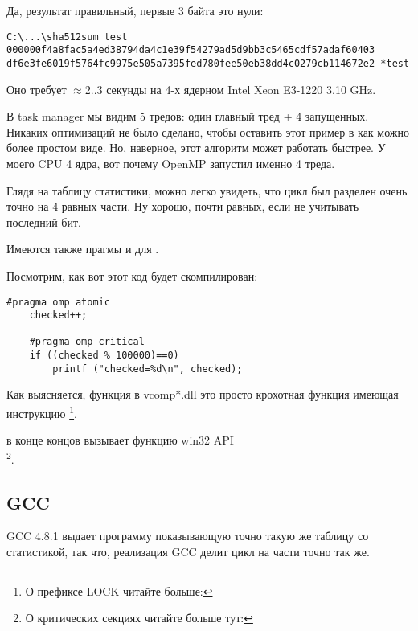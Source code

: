 Да, результат правильный, первые 3 байта это нули:

\begin{lstlisting}
C:\...\sha512sum test
000000f4a8fac5a4ed38794da4c1e39f54279ad5d9bb3c5465cdf57adaf60403
df6e3fe6019f5764fc9975e505a7395fed780fee50eb38dd4c0279cb114672e2 *test
\end{lstlisting}

Оно требует $\approx2..3$ секунды на 4-х ядерном Intel Xeon E3-1220 3.10 GHz.

В task manager мы видим 5 тредов: один главный тред + 4 запущенных.
Никаких оптимизаций не было сделано, чтобы оставить этот пример в как можно более простом виде.
Но, наверное, этот алгоритм может работать быстрее.
У моего \ac{CPU} 4 ядра, вот почему OpenMP запустил именно 4 треда.

Глядя на таблицу статистики, можно легко увидеть, что цикл был разделен очень точно на 4 равных части.
Ну хорошо, почти равных, если не учитывать последний бит.

Имеются также прагмы и для .

Посмотрим, как вот этот код будет скомпилирован:

\begin{lstlisting}[style=customc]
	#pragma omp atomic
	checked++;

	#pragma omp critical
	if ((checked % 100000)==0)
		printf ("checked=%d\n", checked);
\end{lstlisting}



Как выясняется, функция  
в vcomp*.dll это просто крохотная функция имеющая инструкцию
 \footnote{О префиксе LOCK читайте больше: }.

 в конце концов вызывает функцию win32 \ac{API} \\
\footnote{О критических секциях читайте больше тут: }.

\subsection{GCC}

GCC 4.8.1 выдает программу показывающую точно такую же таблицу со статистикой, 
так что, реализация GCC делит цикл на части точно так же.

